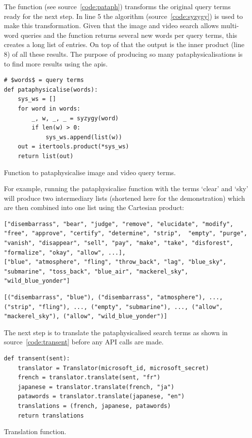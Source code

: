 The  function (see source~\ref{code:pataph}) transforms the original query terms ready for the next step. In line 5 the  algorithm (source~\ref{code:syzygy}) is used to make this transformation. Given that the image and video search allows multi-word queries and the  function returns several new words per query terms, this creates a long list of entries. On top of that the output is the inner product (line 8) of all these results. The purpose of producing so many pataphysicalisations is to find more results using the \glspl{api}.

\begin{listing}
  \begin{verbatim}
# $words$ = query terms
def pataphysicalise(words):
    sys_ws = []
    for word in words:
        _, w, _, _ = syzygy(word)
        if len(w) > 0:
            sys_ws.append(list(w))
    out = itertools.product(*sys_ws)
    return list(out)
  \end{verbatim}
\caption{Function to pataphysicalise image and video query terms.}
\label{code:pataph}
\end{listing}

For example, running the pataphysicalise function with the terms `clear' and `sky' will produce two intermediary lists (shortened here for the demonstration) which are then combined into one list using the Cartesian product:

\begin{verbatim}
["disembarrass", "bear", "judge", "remove", "elucidate", "modify", "free", "approve", "certify", "determine", "strip",  "empty", "purge", "vanish", "disappear", "sell", "pay", "make", "take", "disforest", "formalize", "okay", "allow", ...],
["blue", "atmosphere", "fling", "throw_back", "lag", "blue_sky", "submarine", "toss_back", "blue_air", "mackerel_sky", "wild_blue_yonder"]
\end{verbatim}
\begin{verbatim}
[("disembarrass", "blue"), ("disembarrass", "atmosphere"), ..., ("strip", "fling"), ..., ("empty", "submarine"), ..., ("allow", "mackerel_sky"), ("allow", "wild_blue_yonder")]
\end{verbatim}

The next step is to translate the pataphysicalised search terms as shown in source~\ref{code:transent} before any \ac{API} calls are made.

\begin{listing}
  \begin{verbatim}
def transent(sent):
    translator = Translator(microsoft_id, microsoft_secret)
    french = translator.translate(sent, "fr")
    japanese = translator.translate(french, "ja")
    patawords = translator.translate(japanese, "en")
    translations = (french, japanese, patawords)
    return translations
  \end{verbatim}
\caption{Translation function.}
\label{code:transent}
\end{listing}


